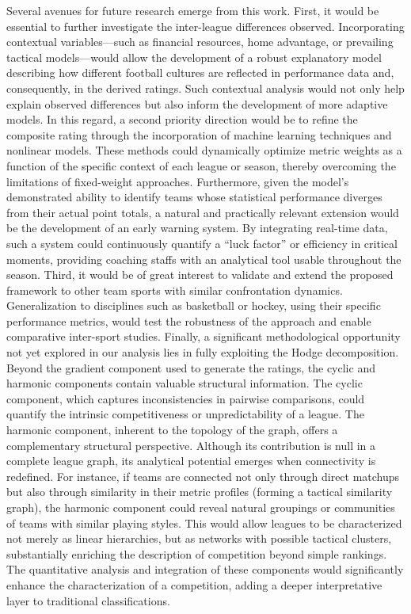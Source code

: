 \documentclass[preprint, amsmath,amssymb, pre]{revtex4-2}
\begin{document}
%
Several avenues for future research emerge from this work. First, it would be essential to further investigate the inter-league differences observed. Incorporating contextual variables—such as financial resources, home advantage, or prevailing tactical models—would allow the development of a robust explanatory model describing how different football cultures are reflected in performance data and, consequently, in the derived ratings.
%
Such contextual analysis would not only help explain observed differences but also inform the development of more adaptive models. In this regard, a second priority direction would be to refine the composite rating through the incorporation of machine learning techniques and nonlinear models. These methods could dynamically optimize metric weights as a function of the specific context of each league or season, thereby overcoming the limitations of fixed-weight approaches.
%
Furthermore, given the model’s demonstrated ability to identify teams whose statistical performance diverges from their actual point totals, a natural and practically relevant extension would be the development of an early warning system. By integrating real-time data, such a system could continuously quantify a ``luck factor'' or efficiency in critical moments, providing coaching staffs with an analytical tool usable throughout the season.
%
Third, it would be of great interest to validate and extend the proposed framework to other team sports with similar confrontation dynamics. Generalization to disciplines such as basketball or hockey, using their specific performance metrics, would test the robustness of the approach and enable comparative inter-sport studies.
%
Finally, a significant methodological opportunity not yet explored in our analysis lies in fully exploiting the Hodge decomposition. Beyond the gradient component used to generate the ratings, the cyclic and harmonic components contain valuable structural information. The cyclic component, which captures inconsistencies in pairwise comparisons, could quantify the intrinsic competitiveness or unpredictability of a league. The harmonic component, inherent to the topology of the graph, offers a complementary structural perspective. Although its contribution is null in a complete league graph, its analytical potential emerges when connectivity is redefined. For instance, if teams are connected not only through direct matchups but also through similarity in their metric profiles (forming a tactical similarity graph), the harmonic component could reveal natural groupings or communities of teams with similar playing styles. This would allow leagues to be characterized not merely as linear hierarchies, but as networks with possible tactical clusters, substantially enriching the description of competition beyond simple rankings.
%
The quantitative analysis and integration of these components would significantly enhance the characterization of a competition, adding a deeper interpretative layer to traditional classifications.
\end{document}

